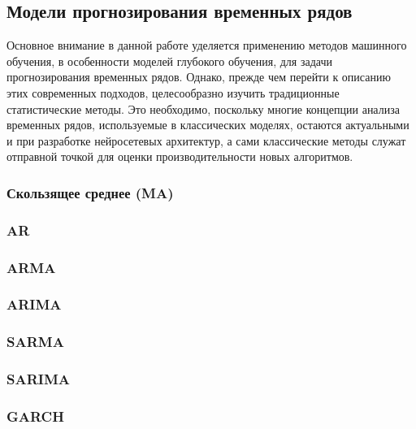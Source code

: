 \subsection{Модели прогнозирования временных рядов}

Основное внимание в данной работе уделяется применению методов 
машинного обучения, в особенности моделей глубокого обучения, 
для задачи прогнозирования временных рядов. Однако, прежде чем перейти к 
описанию этих современных подходов, целесообразно изучить традиционные 
статистические методы. Это необходимо, поскольку многие концепции 
анализа временных рядов, используемые в классических моделях, 
остаются актуальными и при разработке нейросетевых архитектур, а 
сами классические методы служат отправной точкой для оценки 
производительности новых алгоритмов.



\subsubsection{Скользящее среднее (MA)}

% 

\subsubsection{AR}

\subsubsection{ARMA}

\subsubsection{ARIMA}

\subsubsection{SARMA}

\subsubsection{SARIMA}

\subsubsection{GARCH}

